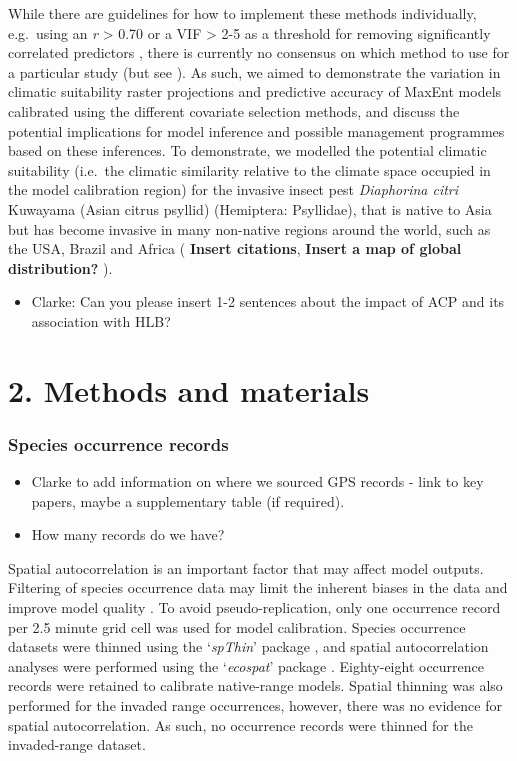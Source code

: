 \documentclass[
  authoryear,
  preprint,
  3p,
  onecolumn]{elsarticle}
\providecommand{\tightlist}{%
  \setlength{\itemsep}{0pt}\setlength{\parskip}{0pt}}\usepackage{longtable,booktabs,array}
\begin{document}
While there are guidelines for how to implement these methods
individually, e.g.~using an \textbar{}\emph{r}\textbar{} \textgreater{}
0.70 or a VIF \textgreater{} 2-5 as a threshold for removing
significantly correlated predictors \citep{Dormann2013}, there is
currently no consensus on which method to use for a particular study
(but see \citet{Adde2023}). As such, we aimed to demonstrate the
variation in climatic suitability raster projections and predictive
accuracy of MaxEnt models calibrated using the different covariate
selection methods, and discuss the potential implications for model
inference and possible management programmes based on these inferences.
To demonstrate, we modelled the potential climatic suitability (i.e.~the
climatic similarity relative to the climate space occupied in the model
calibration region) for the invasive insect pest \emph{Diaphorina citri}
Kuwayama (Asian citrus psyllid) (Hemiptera: Psyllidae), that is native
to Asia but has become invasive in many non-native regions around the
world, such as the USA, Brazil and Africa ( \textbf{Insert citations},
\textbf{Insert a map of global distribution?} ).

\begin{itemize}
\tightlist
\item
  Clarke: Can you please insert 1-2 sentences about the impact of ACP
  and its association with HLB?
\end{itemize}

\hypertarget{methods-and-materials}{%
\section{2. Methods and materials}\label{methods-and-materials}}

\hypertarget{species-occurrence-records}{%
\subsubsection{Species occurrence
records}\label{species-occurrence-records}}

\begin{itemize}
\tightlist
\item
  Clarke to add information on where we sourced GPS records - link to
  key papers, maybe a supplementary table (if required).
\item
  How many records do we have?
\end{itemize}

Spatial autocorrelation is an important factor that may affect model
outputs. Filtering of species occurrence data may limit the inherent
biases in the data and improve model quality \citep{Veloz2009}. To avoid
pseudo-replication, only one occurrence record per 2.5 minute grid cell
was used for model calibration. Species occurrence datasets were thinned
using the `\emph{spThin}' package \citep{Aiello-Lammens2015}, and
spatial autocorrelation analyses were performed using the
`\emph{ecospat}' package \citep{DiCola2017}. Eighty-eight occurrence
records were retained to calibrate native-range models. Spatial thinning
was also performed for the invaded range occurrences, however, there was
no evidence for spatial autocorrelation. As such, no occurrence records
were thinned for the invaded-range dataset.
\end{document}

